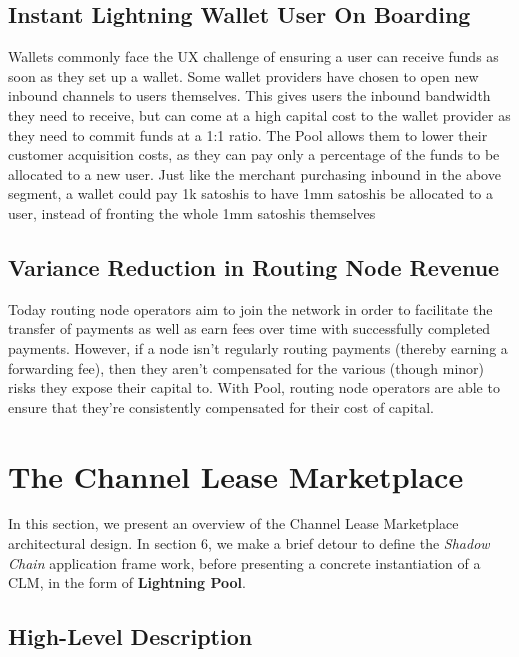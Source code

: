 \documentclass[12pt,a4paper]{article}
\theoremstyle{definition}
\begin{document}
\subsection{Instant Lightning Wallet User On Boarding}

Wallets commonly face the UX challenge of ensuring a user can receive funds as
soon as they set up a wallet. Some wallet providers have chosen to open new
inbound channels to users themselves. This gives users the inbound bandwidth
they need to receive, but can come at a high capital cost to the wallet
provider as they need to commit funds at a 1:1 ratio. The Pool allows them to
lower their customer acquisition costs, as they can pay only a percentage of
the funds to be allocated to a new user. Just like the merchant purchasing
inbound in the above segment, a wallet could pay 1k satoshis to have 1mm
satoshis be allocated to a user, instead of fronting the whole 1mm satoshis
themselves

\subsection{Variance Reduction in Routing Node Revenue}

Today routing node operators aim to join the network in order to facilitate the
transfer of payments as well as earn fees over time with successfully completed
payments. However, if a node isn't regularly routing payments (thereby earning
a forwarding fee), then they aren't compensated for the various (though minor)
risks they expose their capital to. With Pool, routing node operators are able
to ensure that they're consistently compensated for their cost of capital.

\section{The Channel Lease Marketplace} %

In this section, we present an overview of the Channel Lease Marketplace
architectural design. In section 6, we make a brief detour to define the
\emph{Shadow Chain} application frame work, before presenting a concrete
instantiation of a CLM, in the form of \textbf{Lightning Pool}.

\subsection{High-Level Description}
\end{document}
